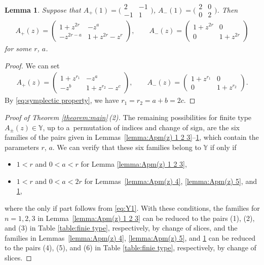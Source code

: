 \documentclass[10pt,a4paper]{amsart}
\numberwithin{equation}{section}
\newtheorem{Lemma}[Theorem]{Lemma}
\theoremstyle{definition}
\begin{document}
\begin{Lemma}\label{lemma:Apm(z) 6}
 Suppose that
$
 A_{+}(1) =
 \bigl( \begin{smallmatrix}
 2 & - 1 \\
 -1 & 1
 \end{smallmatrix}\bigr)$, $
 A_{-}(1) =
 \bigl( \begin{smallmatrix}
 2 & 0 \\
 0 & 2
 \end{smallmatrix}\bigr)$.
 Then
 \begin{align*}
 A_{+}(z) =
 \begin{pmatrix}
 1+z^{2r} & - z^a \\
 -z^{2r-a} & 1+z^{2r}-z^r
 \end{pmatrix},\qquad
 A_{-}(z) =
 \begin{pmatrix}
 1+z^{2r} & 0 \\
 0 & 1+z^{2r}
 \end{pmatrix}
 \end{align*}
 for some $r$, $a$.
\end{Lemma}
\begin{proof}
 We can set
 \begin{align*}
 A_{+}(z) =
 \begin{pmatrix}
 1+z^{r_1} & - z^a \\
 -z^{b} & 1+z^{r_2}-z^c
 \end{pmatrix},\qquad
 A_{-}(z) =
 \begin{pmatrix}
 1+z^{r_1} & 0 \\
 0 & 1+z^{r_2}
 \end{pmatrix}.
 \end{align*}
 By \eqref{eq:symplectic property},
 we have $r_1=r_2=a+b=2c$.
\end{proof}

\begin{proof}[Proof of Theorem \ref{theorem:main}\,(2)]
The remaining possibilities for
finite type $A_\pm (z) \in \mathbb{Y}$,
up to a~permutation of indices and change of sign,
are the six families of the pairs
given in Lemmas~\ref{lemma:Apm(z) 1 2 3}--\ref{lemma:Apm(z) 6}, which contain the parameters $r$, $a$.
We can verify that these six families belong to $\mathbb{Y}$
if only if
\begin{itemize}\itemsep=0pt
 \item $1 < r$ and $0 < a < r$ for Lemma \ref{lemma:Apm(z) 1 2 3},
 \item $1 < r$ and $0 < a < 2r$ for Lemmas~\ref{lemma:Apm(z) 4}, \ref{lemma:Apm(z) 5}, and \ref{lemma:Apm(z) 6},
\end{itemize}
where the only if part follows from \eqref{eq:Y1}.
With these conditions,
the families for $n = 1, 2, 3$ in Lemma~\ref{lemma:Apm(z) 1 2 3}
can be reduced to the pairs (1), (2), and (3) in Table \ref{table:finie type}, respectively,
by change of slices,
and the families in Lemmas~\ref{lemma:Apm(z) 4}, \ref{lemma:Apm(z) 5}, and \ref{lemma:Apm(z) 6}
can be reduced to the pairs (4), (5), and (6) in Table \ref{table:finie type}, respectively,
by change of slices.
\end{proof}
\end{document}
